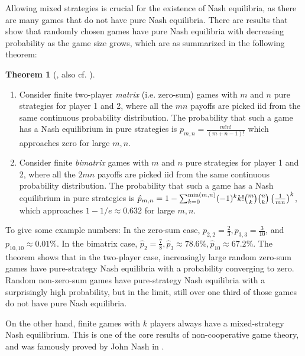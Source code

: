 \documentclass[a4paper,DIV=11]{scrreprt}
\theoremstyle{definition}
\newtheorem{thm}{Theorem}[chapter] %
\begin{document}
    Allowing mixed strategies is crucial for the existence of Nash equilibria, as there are many games that do not have pure Nash equilibria. There are results that show that randomly chosen games have pure Nash equilibria with decreasing probability as the game size grows, which are as summarized in the following theorem:
    \begin{thm}[{\cite{bib:goldbergProbabilityOfEquilibria}, also cf. \cites[p.15]{bib:matsumotoGameTheory}[Exercise 1.2]{bib:nisanAlgorithmicGameTheoryCh1Basic}}]~
        \label{thm:probabilityOfPureNashEquilibria}
        \begin{enumerate}
            \item
            Consider finite two-player \emph{matrix} (i.e. zero-sum) games with $m$ and $n$ pure strategies for player 1 and 2, where all the $mn$ payoffs are picked iid from the same continuous probability distribution.
            The probability that such a game has a Nash equilibrium in pure strategies is $p_{m, n} = \frac{m! n!}{(m+n-1)!}$ which approaches zero for large $m, n$.
            
            \item 
            Consider finite \emph{bimatrix} games with $m$ and $n$ pure strategies for player 1 and 2, where all the $2mn$ payoffs are picked iid from the same continuous probability distribution.
            The probability that such a game has a Nash equilibrium in pure strategies is 
            $\hat{p}_{m, n} = 1 - \sum_{k=0}^{\min(m, n)} (-1)^k k! \binom{m}{k} \binom{n}{k} \left(\frac{1}{mn}\right)^k$,
            which approaches $1 - 1/e \approx 0.632$ for large $m, n$.
        \end{enumerate}
    \end{thm}

    To give some example numbers: In the zero-sum case, $p_{2, 2} = \frac{2}{3}, p_{3, 3}=\frac{3}{10}$, and $p_{10, 10} \approx 0.01\%$. In the bimatrix case, $\hat{p}_{2} = \frac{7}{8}, \hat{p}_{3} \approx 78.6\%, \hat{p}_{10} \approx 67.2\%$.
    The theorem shows that in the two-player case, increasingly large random zero-sum games have pure-strategy Nash equilibria with a probability converging to zero. Random non-zero-sum games have pure-strategy Nash equilibria with a surprisingly high probability, but in the limit, still over one third of those games do not have pure Nash equilibria.
    
    On the other hand, finite games with $k$ players always have a mixed-strategy Nash equilibrium. This is one of the core results of non-cooperative game theory, and was famously proved by John Nash in \cite{bib:nashOnePageProofOfEquilibria}.
    
\end{document}
